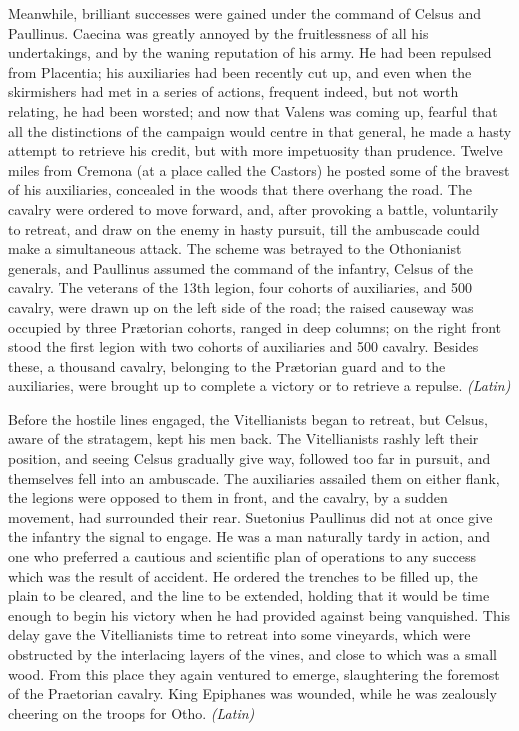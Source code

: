 Meanwhile, brilliant successes were gained under the command of Celsus and Paullinus. Caecina was greatly annoyed by the fruitlessness of all his undertakings, and by the waning reputation of his army. He had been repulsed from Placentia; his auxiliaries had been recently cut up, and even when the skirmishers had met in a series of actions, frequent indeed, but not worth relating, he had been worsted; and now that Valens was coming up, fearful that all the distinctions of the campaign would centre in that general, he made a hasty attempt to retrieve his credit, but with more impetuosity than prudence. Twelve miles from Cremona (at a place called the Castors) he posted some of the bravest of his auxiliaries, concealed in the woods that there overhang the road. The cavalry were ordered to move forward, and, after provoking a battle, voluntarily to retreat, and draw on the enemy in hasty pursuit, till the ambuscade could make a simultaneous attack. The scheme was betrayed to the Othonianist generals, and Paullinus assumed the command of the infantry, Celsus of the cavalry. The veterans of the 13th legion, four cohorts of auxiliaries, and 500 cavalry, were drawn up on the left side of the road; the raised causeway was occupied by three Prætorian cohorts, ranged in deep columns; on the right front stood the first legion with two cohorts of auxiliaries and 500 cavalry. Besides these, a thousand cavalry, belonging to the Prætorian guard and to the auxiliaries, were brought up to complete a victory or to retrieve a repulse. \emph{(Latin)}


Before the hostile lines engaged, the Vitellianists began to retreat, but Celsus, aware of the stratagem, kept his men back. The Vitellianists rashly left their position, and seeing Celsus gradually give way, followed too far in pursuit, and themselves fell into an ambuscade. The auxiliaries assailed them on either flank, the legions were opposed to them in front, and the cavalry, by a sudden movement, had surrounded their rear. Suetonius Paullinus did not at once give the infantry the signal to engage. He was a man naturally tardy in action, and one who preferred a cautious and scientific plan of operations to any success which was the result of accident. He ordered the trenches to be filled up, the plain to be cleared, and the line to be extended, holding that it would be time enough to begin his victory when he had provided against being vanquished. This delay gave the Vitellianists time to retreat into some vineyards, which were obstructed by the interlacing layers of the vines, and close to which was a small wood. From this place they again ventured to emerge, slaughtering the foremost of the Praetorian cavalry. King Epiphanes was wounded, while he was zealously cheering on the troops for Otho. \emph{(Latin)}

